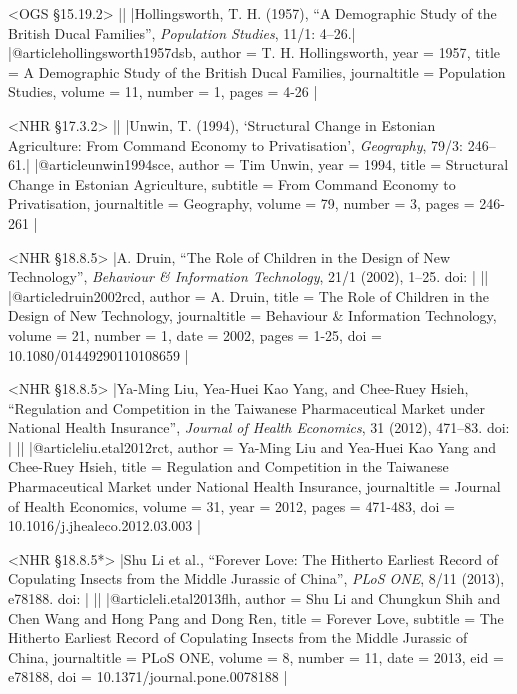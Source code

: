 \documentclass[extrafontsizes,11pt,a4paper,oneside]{memoir}
\begin{document}
\bibexample<OGS \S15.19.2>
||%
|Hollingsworth, T. H. (1957), \enquote{A Demographic Study of the British Ducal Families}, \emph{Population Studies}, 11/1: 4–26.|%
|@article{hollingsworth1957dsb,
  author = {T. H. Hollingsworth},
  year = {1957},
  title = {A Demographic Study of the British Ducal Families},
  journaltitle = {Population Studies},
  volume = {11},
  number = {1},
  pages = {4-26}
}|

\bibexample<NHR \S17.3.2>
||%
|Unwin, T. (1994), ‘Structural Change in Estonian Agriculture: From Command Economy to Privatisation’, \emph{Geography}, 79/3: 246–61.|%
|@article{unwin1994sce,
  author = {Tim Unwin},
  year = {1994},
  title = {Structural Change in Estonian Agriculture},
  subtitle = {From Command Economy to Privatisation},
  journaltitle = {Geography},
  volume = {79},
  number = {3},
  pages = {246-261}
}|

\bibexample<NHR \S18.8.5>
|A. Druin, \enquote{The Role of Children in the Design of New Technology}, \emph{Behaviour \& Information Technology}, 21/1 (2002), 1–25. doi: |%
||%
|@article{druin2002rcd,
  author = {A. Druin},
  title = {The Role of Children in the Design of New Technology},
  journaltitle = {Behaviour \& Information Technology},
  volume = {21},
  number = {1},
  date = {2002},
  pages = {1-25},
  doi = {10.1080/01449290110108659}
}|

\bibexample<NHR \S18.8.5>
|Ya-Ming Liu, Yea-Huei Kao Yang, and Chee-Ruey Hsieh, \enquote{Regulation and Competition in the Taiwanese Pharmaceutical Market under National Health Insurance}, \emph{Journal of Health Economics}, 31 (2012), 471–83. doi: |%
||%
|@article{liu.etal2012rct,
  author = {Ya-Ming Liu and Yea-Huei Kao Yang and Chee-Ruey Hsieh},
  title = {Regulation and Competition in the Taiwanese Pharmaceutical Market under National Health Insurance},
  journaltitle = {Journal of Health Economics},
  volume = {31},
  year = {2012},
  pages = {471-483},
  doi = {10.1016/j.jhealeco.2012.03.003}
}|

\bibexample<NHR \S18.8.5*>
|Shu Li et al., \enquote{Forever Love: The Hitherto Earliest Record of Copulating Insects from the Middle Jurassic of China}, \emph{PLoS ONE}, 8/11 (2013), e78188. doi: |%
||%
|@article{li.etal2013flh,
  author = {Shu Li and Chungkun Shih and Chen Wang and Hong Pang and Dong Ren},
  title = {Forever Love},
  subtitle = {The Hitherto Earliest Record of Copulating Insects from the Middle Jurassic of China},
  journaltitle = {PLoS ONE},
  volume = {8},
  number = {11},
  date = {2013},
  eid = {e78188},
  doi = {10.1371/journal.pone.0078188}
}|
\end{document}
